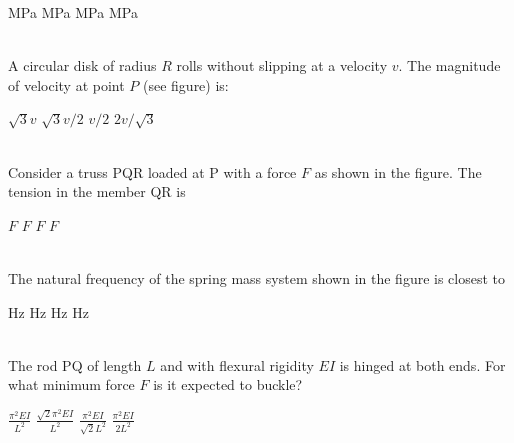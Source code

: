 \documentclass[addpoints,11pt]{exam}
\begin{document}
\begin{questions}
        \begin{oneparchoices}
             MPa
             MPa
             MPa
             MPa
        \end{oneparchoices}\\

        \question A circular disk of radius $R$ rolls without slipping at a velocity $v$. The magnitude of velocity at point $P$ (see figure) is: %

        \begin{oneparchoices}
            \choice $\sqrt{3}v$
            \choice $\sqrt{3}v/2$
            \choice $v/2$
            \choice $2v/\sqrt{3}$
        \end{oneparchoices}\\

        \question Consider a truss PQR loaded at P with a force $F$ as shown in the figure. %
        The tension in the member QR is

        \begin{oneparchoices}
             $F$
             $F$
             $F$
             $F$
        \end{oneparchoices}\\

        \question The natural frequency of the spring mass system shown in the figure is closest to %

        \begin{oneparchoices}
             Hz
             Hz
             Hz
             Hz
        \end{oneparchoices}\\

        \question The rod PQ of length $L$ and with flexural rigidity $EI$ is hinged at both ends. For what minimum force $F$ is it expected to buckle?\\

        \begin{oneparchoices}
            \choice $\frac{\pi^2EI}{L^2}$
            \choice $\frac{\sqrt{2}\pi^2EI}{L^2}$
            \choice $\frac{\pi^2EI}{\sqrt{2}L^2}$
            \choice $\frac{\pi^2EI}{2L^2}$
        \end{oneparchoices}\\


\end{questions}
\end{document}
